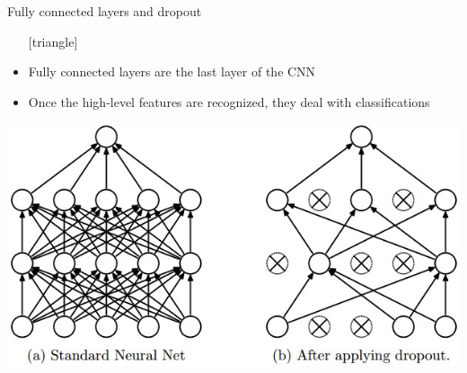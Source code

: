 \documentclass{beamer}
\begin{document}
\begin{frame}{Fully connected layers and dropout}
\begin{itemize}
\setlength\itemsep{1em}
[triangle]
\item Fully connected layers are the last layer of the CNN
\item Once the high-level features are recognized, they deal with classifications
\end{itemize}
\begin{center}
\includegraphics[scale=0.35]{dropout}
\end{center}
\end{frame}
\end{document}
